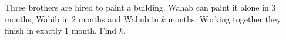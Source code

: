 Three brothers are hired to paint a building. Wahab can paint it alone in $3$ months, Wahib in $2$ months and Wahub in $k$ months. Working together they finish in exactly $1$ month. Find $k$.
